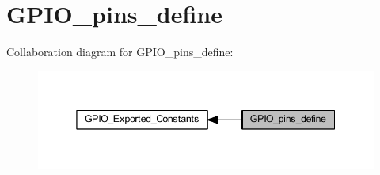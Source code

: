 \hypertarget{group___g_p_i_o__pins__define}{}\section{G\+P\+I\+O\+\_\+pins\+\_\+define}
\label{group___g_p_i_o__pins__define}
Collaboration diagram for G\+P\+I\+O\+\_\+pins\+\_\+define\+:
\nopagebreak
\begin{figure}[H]
\begin{center}
\leavevmode
\includegraphics[width=345pt]{group___g_p_i_o__pins__define}
\end{center}
\end{figure}
